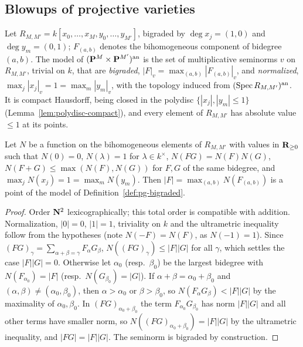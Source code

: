 \subsection{Blowups of projective varieties}\label{subsec:pg-blowup}

\begin{definition}\label{def:pg-bigraded}
\leanok
{}
Let $R_{M,M'}=k[x_0,\dots,x_M,y_0,\dots,y_{M'}]$, bigraded by $\deg x_j=(1,0)$ and $\deg y_m=(0,1)$; $F_{(a,b)}$ denotes the
bihomogeneous component of bidegree $(a,b)$. The model of $(\mathbf{P}^M\times\mathbf{P}^{M'})^{\mathrm{an}}$ is the set of multiplicative seminorms $v$ on
$R_{M,M'}$, trivial on $k$, that are \emph{bigraded}, $|F|_v=\max_{(a,b)}|F_{(a,b)}|_v$, and \emph{normalized},
$\max_j|x_j|_v=1=\max_m|y_m|_v$, with the topology induced from $(\operatorname{Spec} R_{M,M'})^{\mathrm{an}}$. It is compact Hausdorff, being closed in
the polydisc $\{|x_j|,|y_m|\le1\}$ (Lemma~\ref{lem:polydisc-compact}), and every element of $R_{M,M'}$ has absolute value $\le1$ at its
points.
\end{definition}

\begin{lemma}\label{lem:pg-bigraded-extension}
\leanok
{}
Let $N$ be a function on the bihomogeneous elements of $R_{M,M'}$ with values in $\mathbf{R}_{\ge0}$ such that $N(0)=0$, $N(\lambda)=1$ for
$\lambda\in k^\times$, $N(FG)=N(F)N(G)$, $N(F+G)\le\max(N(F),N(G))$ for $F,G$ of the same bidegree, and
$\max_jN(x_j)=1=\max_mN(y_m)$. Then $|F|=\max_{(a,b)}N(F_{(a,b)})$ is a point of the model of Definition~\ref{def:pg-bigraded}.
\end{lemma}

\begin{proof}
Order $\mathbf{N}^2$ lexicographically; this total order is compatible with addition. Normalization, $|0|=0$, $|1|=1$, triviality on $k$
and the ultrametric inequality follow from the hypotheses (note $N(-F)=N(F)$, as $N(-1)=1$). Since
$(FG)_\gamma=\sum_{\alpha+\beta=\gamma}F_\alpha G_\beta$, $N((FG)_\gamma)\le|F||G|$ for all $\gamma$, which settles the case $|F||G|=0$. Otherwise let
$\alpha_0$ (resp.\ $\beta_0$) be the largest bidegree with $N(F_{\alpha_0})=|F|$ (resp.\ $N(G_{\beta_0})=|G|$). If $\alpha+\beta=\alpha_0+\beta_0$ and
$(\alpha,\beta)\ne(\alpha_0,\beta_0)$, then $\alpha>\alpha_0$ or $\beta>\beta_0$, so $N(F_\alpha G_\beta)<|F||G|$ by the maximality of $\alpha_0,\beta_0$. In
$(FG)_{\alpha_0+\beta_0}$ the term $F_{\alpha_0}G_{\beta_0}$ has norm $|F||G|$ and all other terms have smaller norm, so
$N((FG)_{\alpha_0+\beta_0})=|F||G|$ by the ultrametric inequality, and $|FG|=|F||G|$. The seminorm is bigraded by construction.
\end{proof}

